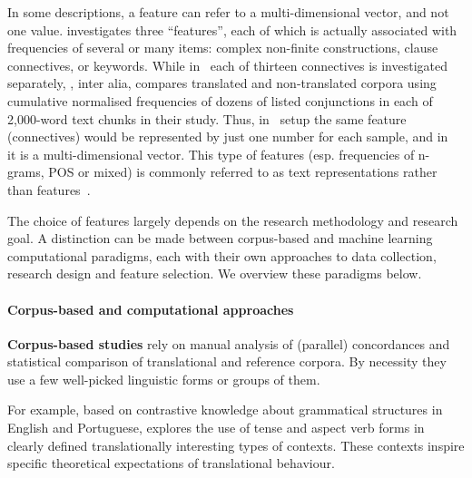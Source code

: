 In some descriptions, a feature can refer to a multi-dimensional vector, and not one value. \citet{Puurtinen2003} investigates three ``features'', each of which is actually associated with frequencies of several or many items: complex non-finite constructions, clause connectives, or keywords. While in~\citet{Puurtinen2003} each of thirteen connectives is investigated separately, \citet{Xiao2010}, inter alia, compares translated and non-translated corpora using cumulative normalised frequencies of dozens of listed conjunctions in each of 2,000-word text chunks in their study. Thus, in~\citet{Xiao2010} setup the same feature (connectives) would be represented by just one number for each sample, and in~\citet{Puurtinen2003} it is a multi-dimensional vector.
This type of features (esp. frequencies of n-grams, POS or mixed) is commonly referred to as text representations rather than features~\cite{Baroni2005,Kurokawa2009}. 

The choice of features largely depends on the research methodology and research goal. A distinction can be made between corpus-based and machine learning computational paradigms, each with their own approaches to data collection, research design and feature selection. We overview these paradigms below.

\paragraph{Corpus-based and computational approaches} 
\label{pg:coling_begin}
\textbf{Corpus-based studies} rely on manual analysis of (parallel) concordances and statistical comparison of translational and reference corpora. By necessity they use a few well-picked linguistic forms or groups of them. 

For example, based on contrastive knowledge about grammatical structures in English and Portuguese, \citet{Santos1995} explores the use of tense and aspect verb forms in clearly defined translationally interesting types of contexts. These contexts inspire specific theoretical expectations of translational behaviour. 

